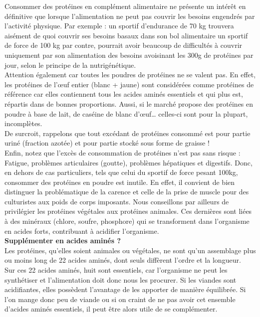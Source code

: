 \documentclass[8pt]{article}
\begin{document}
Consommer des protéines en complément alimentaire ne présente un intérêt en définitive que lorsque l'alimentation ne peut pas couvrir les besoins engendrés par l’activité physique. Par exemple :
un sportif d'endurance de 70 kg trouvera aisément de quoi couvrir ses besoins basaux dans son bol alimentaire
un sportif de force de 100 kg par contre, pourrait avoir beaucoup de difficultés à couvrir uniquement par son alimentation des besoins avoisinant les 300g de protéines par jour, selon le principe de la nutrigénétique.\\

Attention également car toutes les poudres de protéines ne se valent pas. En effet, les protéines de l’œuf entier (blanc + jaune) sont considérées comme protéines de référence car elles contiennent tous les acides aminés essentiels et qui plus est, répartis dans de bonnes proportions. Aussi, si le marché propose des protéines en poudre à base de lait, de caséine de blanc d’œuf… celles-ci sont pour la plupart, incomplètes.\\


De surcroit, rappelons que tout excédant de protéines consommé est pour partie uriné (fraction azotée) et pour partie stocké sous forme de graisse !\\

Enfin, notez que l’excès de consommation de protéines n’est pas sans risque : Fatigue, problèmes articulaires (goutte), problèmes hépatiques et digestifs.
Donc, en dehors de cas particuliers, tels que celui du sportif de force pesant 100kg, consommer des protéines en poudre est inutile. En effet, il convient de bien distinguer la problématique de la carence et celle de la prise de muscle pour des culturistes aux poids de corps imposants.
Nous conseillons par ailleurs de privilégier les protéines végétales aux protéines animales. Ces dernières sont liées à des minéraux (chlore, soufre, phosphore) qui se transforment dans l'organisme en acides forts, contribuant à acidifier l'organisme.\\


\textbf{Supplémenter en acides aminés ?}\\

Les protéines, qu’elles soient animales ou végétales, ne sont qu’un assemblage plus ou moins long de 22 acides aminés, dont seuls diffèrent l’ordre et la longueur.\\

Sur ces 22 acides aminés, huit sont essentiels, car l'organisme ne peut les synthétiser et l'alimentation doit donc nous les procurer.
Si les viandes sont acidifiantes, elles possèdent l'avantage de les apporter de manière équilibrée. Si l'on mange donc peu de viande ou si on craint de ne pas avoir cet ensemble d'acides aminés essentiels, il peut être alors utile de se complémenter.\\
\end{document}
